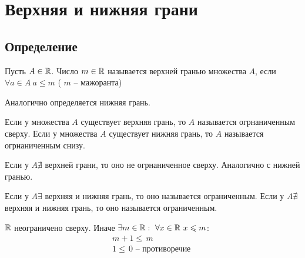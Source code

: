 \section{Верхняя и нижняя грани}
\subsection{Определение}
\begin{definition}
    Пусть $ A \in \mathbb{R} $. Число $ m \in  \mathbb{R} $ называется верхней гранью множества $ A $,
    если $ \forall a \in A \ a \leq  m $ ( $ m $ -- мажоранта)
\end{definition}
Аналогично определяется нижняя грань.
\begin{definition}
    Если у множества $ A $ существует верхняя грань, то $ A $ называется огрнаниченным сверху.
    Если у множества $ A $ существует нижняя грань, то $ A $ называется огрнаниченным снизу.
\end{definition}
\begin{definition}
    Если у $ A   \nexists  $ верхней грани, то оно не огрнаниченное сверху.
    Аналогично с нижней гранью.
\end{definition}
\begin{definition}
    Если у $ A \exists  $ верхняя и нижняя грань, то оно называется ограниченным.
    Если у $ A \nexists  $ верхняя и нижняя грань, то оно называется ограниченным.
\end{definition}
\begin{example}
   $ \mathbb{R} $ неограничено сверху. Иначе $ \exists m \in \mathbb{R}:\ \forall x \in \mathbb{R}\ x \leqslant  m $: \begin{gather}
    m + 1 \leq\, m \\
    1 \leq\, 0 \text{ -- противоречие }
   \end{gather}
\end{example}
